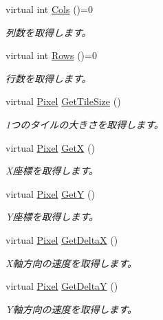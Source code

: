 \begin{DoxyCompactItemize}
\item 
virtual int \hyperlink{class_i_map_tile_layor_a41b142a96432b5de2da71e833006930f}{Cols} ()=0
\begin{DoxyCompactList}\small\item\em 列数を取得します。\end{DoxyCompactList}\item 
virtual int \hyperlink{class_i_map_tile_layor_a803dba2f9709bc5094b0b1e46c650bbe}{Rows} ()=0
\begin{DoxyCompactList}\small\item\em 行数を取得します。\end{DoxyCompactList}\item 
virtual \hyperlink{_shape_8h_a2a49d9a10651b486dec23c8771d3ea98}{Pixel} \hyperlink{class_i_map_tile_layor_a1fc1f35577cc219ee183f307feadbc88}{Get\+Tile\+Size} ()
\begin{DoxyCompactList}\small\item\em 1つのタイルの大きさを取得します。\end{DoxyCompactList}\item 
virtual \hyperlink{_shape_8h_a2a49d9a10651b486dec23c8771d3ea98}{Pixel} \hyperlink{class_i_map_tile_layor_aae0e315c58ba40664a330015279f55aa}{GetX} ()
\begin{DoxyCompactList}\small\item\em X座標を取得します。\end{DoxyCompactList}\item 
virtual \hyperlink{_shape_8h_a2a49d9a10651b486dec23c8771d3ea98}{Pixel} \hyperlink{class_i_map_tile_layor_a8076377d9ddb9e08578a49a2a3e3b96f}{GetY} ()
\begin{DoxyCompactList}\small\item\em Y座標を取得します。\end{DoxyCompactList}\item 
virtual \hyperlink{_shape_8h_a2a49d9a10651b486dec23c8771d3ea98}{Pixel} \hyperlink{class_i_map_tile_layor_a021b4072af5e1cec4939d4cf8c4a1624}{Get\+DeltaX} ()
\begin{DoxyCompactList}\small\item\em X軸方向の速度を取得します。\end{DoxyCompactList}\item 
virtual \hyperlink{_shape_8h_a2a49d9a10651b486dec23c8771d3ea98}{Pixel} \hyperlink{class_i_map_tile_layor_acf089c1961f6f3562f6a9d0ceda477e3}{Get\+DeltaY} ()
\begin{DoxyCompactList}\small\item\em Y軸方向の速度を取得します。\end{DoxyCompactList}\item 

\end{DoxyCompactItemize}
